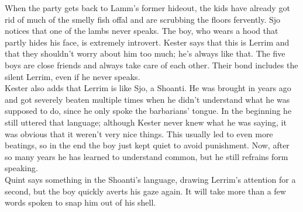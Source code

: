 When the party gets back to Lamm's former hideout, the kids have already got rid of much of the smelly fish offal and are scrubbing the floors fervently. Sjo notices that one of the lambs never speaks. The boy, who wears a hood that partly hides his face, is extremely introvert. Kester says that this is Lerrim and that they shouldn't worry about him too much; he's always like that. The five boys are close friends and always take care of each other. Their bond includes the silent Lerrim, even if he never speaks.\\

Kester also adds that Lerrim is like Sjo, a Shoanti. He was brought in years ago and got severely beaten multiple times when he didn't understand what he was supposed to do, since he only spoke the barbarians' tongue. In the beginning he still uttered that language; although Kester never knew what he was saying, it was obvious that it weren't very nice things. This usually led to even more beatings, so in the end the boy just kept quiet to avoid punishment. Now, after so many years he has learned to understand common, but he still refrains form speaking.\\

Quint says something in the Shoanti's language, drawing Lerrim's attention for a second, but the boy quickly averts his gaze again. It will take more than a few words spoken to snap him out of his shell.\\

